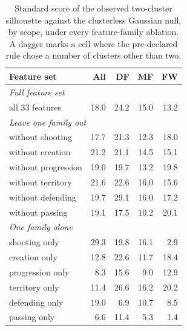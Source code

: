 \begin{table}[t]
\centering
\small
\caption{Standard score of the observed two-cluster silhouette against the clusterless Gaussian null, by scope, under every feature-family ablation. A dagger marks a cell where the pre-declared rule chose a number of clusters other than two.}
\label{tab:ablation}
\begin{tabular}{lrrrr}
\toprule
Feature set & All & DF & MF & FW \\
\midrule
\multicolumn{5}{l}{\emph{Full feature set}} \\
all 33 features & 18.0 & 24.2 & 15.0 & 13.2 \\
\midrule
\multicolumn{5}{l}{\emph{Leave one family out}} \\
without shooting & 17.7 & 21.3 & 12.3 & 18.0 \\
without creation & 21.2 & 21.1 & 14.5 & 15.1 \\
without progression & 19.0 & 19.7 & 13.2 & 19.8 \\
without territory & 21.6 & 22.6 & 16.0 & 15.6 \\
without defending & 19.7 & 29.1 & 16.0 & 17.2 \\
without passing & 19.1 & 17.5 & 10.2 & 20.1 \\
\midrule
\multicolumn{5}{l}{\emph{One family alone}} \\
shooting only & 29.3 & 19.8 & 16.1 & 2.9 \\
creation only & 12.8 & 22.6 & 11.7 & 18.4 \\
progression only & 8.3 & 15.6 & 9.0 & 12.9 \\
territory only & 11.4 & 26.6 & 16.2 & 20.2 \\
defending only & 19.0 & 6.9 & 10.7 & 8.5 \\
passing only & 6.6 & 11.4 & 5.3 & 1.4 \\
\bottomrule
\end{tabular}
\end{table}
